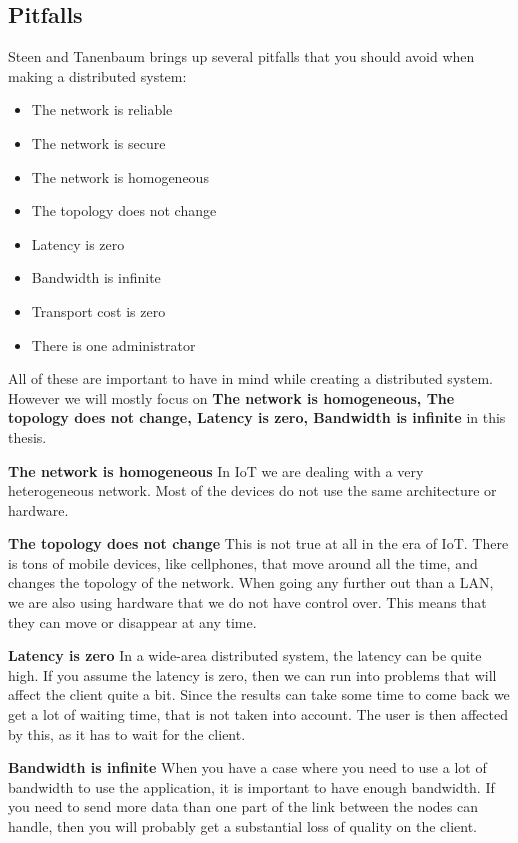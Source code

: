 \subsection{Pitfalls}
Steen and Tanenbaum \cite{steen_distributed_2017} brings up several pitfalls that you should avoid when making a distributed system:
\begin{itemize}
    \item The network is reliable
    \item The network is secure
    \item The network is homogeneous
    \item The topology does not change
    \item Latency is zero
    \item Bandwidth is infinite
    \item Transport cost is zero
    \item There is one administrator
\end{itemize}
All of these are important to have in mind while creating a distributed system. However we will mostly focus on \textbf{The network is homogeneous, The topology does not change, Latency is zero, Bandwidth is infinite} in this thesis. 

\textbf{The network is homogeneous}
In IoT we are dealing with a very heterogeneous network. Most of the devices do not use the same architecture or hardware.

\textbf{The topology does not change}
This is not true at all in the era of IoT. There is tons of mobile devices, like cellphones, that move around all the time, and changes the topology of the network. When going any further out than a LAN, we are also using hardware that we do not have control over. This means that they can move or disappear at any time.

\textbf{Latency is zero}
In a wide-area distributed system, the latency can be quite high. If you assume the latency is zero, then we can run into problems that will affect the client quite a bit. Since the results can take some time to come back we get a lot of waiting time, that is not taken into account. The user is then affected by this, as it has to wait for the client. 

\textbf{Bandwidth is infinite}
When you have a case where you need to use a lot of bandwidth to use the application, it is important to have enough bandwidth. If you need to send more data than one part of the link between the nodes can handle, then you will probably get a substantial loss of quality on the client. 


